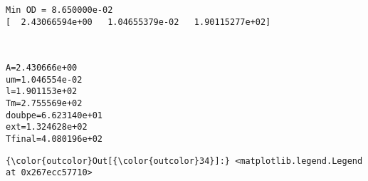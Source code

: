 \documentclass[11pt]{article}
\begin{document}
    \begin{Verbatim}[commandchars=\\\{\}]
Min OD = 8.650000e-02
[  2.43066594e+00   1.04655379e-02   1.90115277e+02]

    \end{Verbatim}

    \begin{center}
    \end{center}
    { \hspace*{\fill} \\}
    
    \begin{Verbatim}[commandchars=\\\{\}]
A=2.430666e+00
um=1.046554e-02
l=1.901153e+02
Tm=2.755569e+02
doubpe=6.623140e+01
ext=1.324628e+02
Tfinal=4.080196e+02

    \end{Verbatim}

            \begin{Verbatim}[commandchars=\\\{\}]
{\color{outcolor}Out[{\color{outcolor}34}]:} <matplotlib.legend.Legend at 0x267ecc57710>
\end{Verbatim}
        
    \begin{center}
    \end{center}
    { \hspace*{\fill} \\}
    
    \begin{center}
    \end{center}
    { \hspace*{\fill} \\}
    
\end{document}
